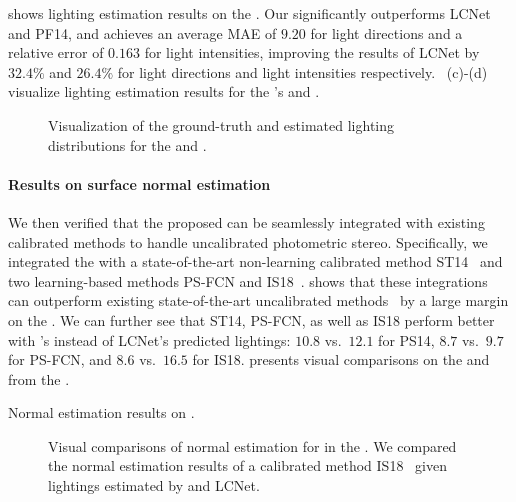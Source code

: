 shows lighting estimation results on the \lightstage. Our \gcnetacronym significantly outperforms LCNet and PF14, and achieves an average MAE of $9.20$ for light directions and a relative error of $0.163$ for light intensities, improving the results of LCNet by $32.4\%$ and $26.4\%$ for light directions and light intensities respectively.
~(c)-(d) visualize lighting estimation results for the \lightstage's  and .

\begin{figure}[tbp] \centering%
    
    \caption[Visualization of the estimated lighting distributions]{Visualization of the ground-truth and estimated lighting distributions for the \diligent and \lightstage. } \label{fig:qual_lighting} %
\end{figure}

\paragraph{Results on surface normal estimation}
We then verified that the proposed \gcnetacronym can be seamlessly integrated with existing calibrated methods to handle uncalibrated photometric stereo. 
Specifically, we integrated the \gcnetacronym with a state-of-the-art non-learning calibrated method ST14~\cite{shi2014bi} and two learning-based methods PS-FCN and IS18~\cite{ikehata2018cnn}.
 shows that these integrations can outperform existing state-of-the-art uncalibrated methods~\cite{alldrin2007r,shi2010self,wu2013calib,lu2013uncalibrated,papad14closed,lu2018symps} by a large margin on the \diligent.
We can further see that ST14, PS-FCN, as well as IS18 perform better with \gcnetacronym's instead of LCNet's predicted lightings: $10.8$ vs.\ $12.1$ for PS14, $8.7$ vs.\ $9.7$ for PS-FCN, and $8.6$ vs.\ $16.5$ for IS18.
 presents visual comparisons on the  and  from the \diligent. 

\begin{table}[tbp] \centering
    \caption[Normal estimation results on \diligent]{Normal estimation results on \diligent.}
     \label{tab:quant_diligent_normal}
\end{table}

\begin{figure}[htbp] \centering
    
    \caption[Visual comparisons of normal estimation for  and ]{Visual comparisons of normal estimation for  in the \diligent. We compared the normal estimation results of a calibrated method IS18~\cite{ikehata2018cnn} given lightings estimated by \gcnetacronym and LCNet.} \label{fig:qual_diligent_normal}
\end{figure} 

